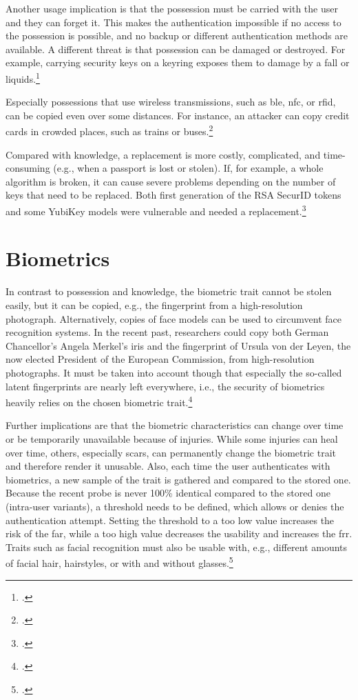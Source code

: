 Another usage implication is that the possession must be carried with the user and they can forget it. This makes the authentication impossible if no access to the possession is possible, and no backup or different authentication methods are available. A different threat is that possession can be damaged or destroyed. For example, carrying security keys on a keyring exposes them to damage by a fall or liquids.\footcites[See][263--264]{shostack2014threat}

Especially possessions that use wireless transmissions, such as \gls{ble}, \gls{nfc}, or \gls{rfid}, can be copied even over some distances. For instance, an attacker can copy credit cards in crowded places, such as trains or buses.\footcite[See][2--3]{6892730}

Compared with knowledge, a replacement is more costly, complicated, and time-consuming (e.g., when a passport is lost or stolen). If, for example, a whole algorithm is broken, it can cause severe problems depending on the number of keys that need to be replaced. Both first generation of the RSA SecurID tokens and some YubiKey models were vulnerable and needed a replacement.\footcites[See][18]{dasgupta2017multi}[See][364--265]{BIRYUKOV2005364}[See][]{yubikey-heise}

\section{Biometrics}

In contrast to possession and knowledge, the biometric trait cannot be stolen easily, but it can be copied, e.g., the fingerprint from a high-resolution photograph. Alternatively, copies of face models can be used to circumvent face recognition systems. In the recent past, researchers could copy both German Chancellor's Angela Merkel's iris and the fingerprint of Ursula von der Leyen, the now elected President of the European Commission, from high-resolution photographs. It must be taken into account though that especially the so-called latent fingerprints are nearly left everywhere, i.e., the security of biometrics heavily relies on the chosen biometric trait.\footcites[See][7--8]{185181}[See][7--8]{220566}[See][p. e199]{MARTIN2013e189}[See][]{ccc-merkel}

Further implications are that the biometric characteristics can change over time or be temporarily unavailable because of injuries. While some injuries can heal over time, others, especially scars, can permanently change the biometric trait and therefore render it unusable. Also, each time the user authenticates with biometrics, a new sample of the trait is gathered and compared to the stored one. Because the recent probe is never 100\% identical compared to the stored one (\frqq intra-user variants\flqq), a threshold needs to be defined, which allows or denies the authentication attempt. Setting the threshold to a too low value increases the risk of the \gls{far}, while a too high value decreases the usability and increases the \gls{frr}. Traits such as facial recognition must also be usable with, e.g., different amounts of facial hair, hairstyles, or with and without glasses.\footcites[See][13--17, 52, 98]{Jain2011}

